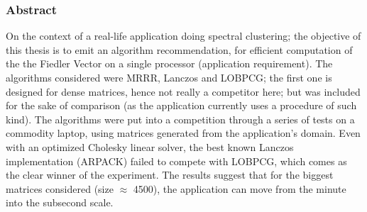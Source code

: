 \begin{frame}
  \frametitle{Abstract}
  \begin{block}{}
    On the context of a real-life application doing spectral
    clustering; the objective of this thesis is to emit an algorithm
    recommendation, for efficient 
    computation of the the Fiedler Vector on a single processor
    (application requirement). The algorithms considered were
    MRRR, Lanczos and LOBPCG; the first one is designed for dense
    matrices, hence not really a competitor here; but was 
    included for the sake of comparison (as the application currently
    uses a procedure of such kind). The algorithms were put into
    a competition through a series of tests on a commodity laptop, 
    using matrices generated from the application's domain. Even with
    an optimized Cholesky linear solver, the best known Lanczos
    implementation (ARPACK) failed to compete with LOBPCG, which comes
    as the clear winner of the experiment. The results suggest that
    for the biggest matrices considered (size $\approx$ 4500), the application can
    move from the minute into the subsecond scale. 
  \end{block}
\end{frame}
